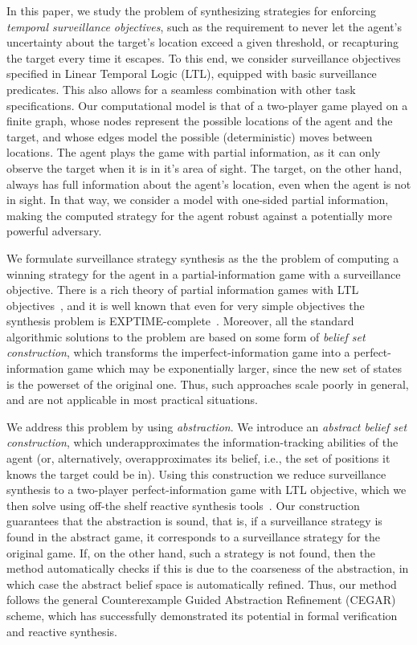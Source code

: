 In this paper, we study the problem of synthesizing strategies for enforcing \emph{temporal surveillance objectives}, such as the requirement to never let the agent's uncertainty about the target's location exceed a given threshold, or recapturing the target every time it escapes. To this end, we consider surveillance objectives specified in Linear Temporal Logic (LTL), equipped with basic surveillance predicates. This also allows for a seamless combination with other task specifications. Our computational model is that of a two-player game played on a finite graph, whose nodes represent the possible locations of the agent and the target, and whose edges model the possible (deterministic) moves between locations. The agent plays the game with partial information, as it can only observe the target when  it is in it's area of sight. The target, on the other hand, always has full information about the agent's location, even when the agent is not in sight. In that way, we consider a model with one-sided partial information, making the computed strategy for the agent robust against a potentially more powerful adversary. 

We formulate surveillance strategy synthesis as the the problem of computing a winning strategy for the agent in a partial-information game with a surveillance objective. There is a rich theory of partial information games with LTL objectives~\cite{DoyenR11,Chatterjee2013}, and it is well known that even for very simple objectives the synthesis problem is EXPTIME-complete~\cite{Reif84,BerwangerD08}. Moreover, all the standard algorithmic solutions to the problem are based on some form of \emph{belief set construction}, which transforms the imperfect-information game into a perfect-information game which may be exponentially larger, since the new set of states is the powerset of the original one. Thus, such approaches scale poorly in general, and are not applicable in most practical situations.

We address this problem by using \emph{abstraction}. We introduce an \emph{abstract belief set construction}, which underapproximates the information-tracking abilities of the agent (or, alternatively, overapproximates its belief, i.e., the set of positions it knows the target could be in). Using this construction we reduce surveillance synthesis to a two-player perfect-information game with LTL objective, which we then solve using off-the shelf reactive synthesis tools~\cite{EhlersR16}. Our construction guarantees that the abstraction is sound, that is, if a surveillance strategy is found in the abstract game, it corresponds to a surveillance strategy for the original game. If, on the other hand, such a strategy is not found, then the method automatically checks if this is due to the coarseness of the abstraction, in which case the abstract belief space is automatically refined. Thus, our method follows the general Counterexample Guided Abstraction Refinement (CEGAR)~\cite{ClarkeGJLV00} scheme, which has successfully demonstrated its potential in formal verification and reactive synthesis.

